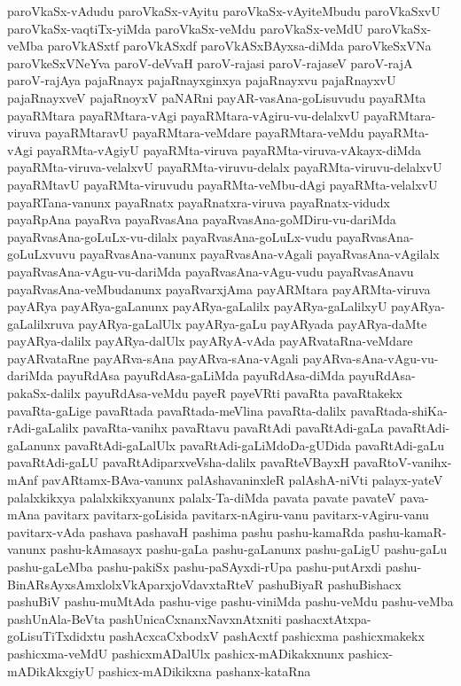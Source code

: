 {paroVkaSx-vAdudu
paroVkaSx-vAyitu
paroVkaSx-vAyiteMbudu
paroVkaSxvU
paroVkaSx-vaqtiTx-yiMda
paroVkaSx-veMdu
paroVkaSx-veMdU
paroVkaSx-veMba
paroVkASxtf
paroVkASxdf
paroVkASxBAyxsa-diMda
paroVkeSxVNa
paroVkeSxVNeYva
paroV-deVvaH
paroV-rajasi
paroV-rajaseV
paroV-rajA
paroV-rajAya
pajaRnayx
pajaRnayxginxya
pajaRnayxvu
pajaRnayxvU
pajaRnayxveV
pajaRnoyxV
paNARni
payAR-vasAna-goLisuvudu
payaRMta
payaRMtara
payaRMtara-vAgi
payaRMtara-vAgiru-vu-delalxvU
payaRMtara-viruva
payaRMtaravU
payaRMtara-veMdare
payaRMtara-veMdu
payaRMta-vAgi
payaRMta-vAgiyU
payaRMta-viruva
payaRMta-viruva-vAkayx-diMda
payaRMta-viruva-velalxvU
payaRMta-viruvu-delalx
payaRMta-viruvu-delalxvU
payaRMtavU
payaRMta-viruvudu
payaRMta-veMbu-dAgi
payaRMta-velalxvU
payaRTana-vanunx
payaRnatx
payaRnatxra-viruva
payaRnatx-vidudx
payaRpAna
payaRva
payaRvasAna
payaRvasAna-goMDiru-vu-dariMda
payaRvasAna-goLuLx-vu-dilalx
payaRvasAna-goLuLx-vudu
payaRvasAna-goLuLxvuvu
payaRvasAna-vanunx
payaRvasAna-vAgali
payaRvasAna-vAgilalx
payaRvasAna-vAgu-vu-dariMda
payaRvasAna-vAgu-vudu
payaRvasAnavu
payaRvasAna-veMbudanunx
payaRvarxjAma
payARMtara
payARMta-viruva
payARya
payARya-gaLanunx
payARya-gaLalilx
payARya-gaLalilxyU
payARya-gaLalilxruva
payARya-gaLalUlx
payARya-gaLu
payARyada
payARya-daMte
payARya-dalilx
payARya-dalUlx
payARyA-vAda
payARvataRna-veMdare
payARvataRne
payARva-sAna
payARva-sAna-vAgali
payARva-sAna-vAgu-vu-dariMda
payuRdAsa
payuRdAsa-gaLiMda
payuRdAsa-diMda
payuRdAsa-pakaSx-dalilx
payuRdAsa-veMdu
payeR
payeVRti
pavaRta
pavaRtakekx
pavaRta-gaLige
pavaRtada
pavaRtada-meVlina
pavaRta-dalilx
pavaRtada-shiKa-rAdi-gaLalilx
pavaRta-vanihx
pavaRtavu
pavaRtAdi
pavaRtAdi-gaLa
pavaRtAdi-gaLanunx
pavaRtAdi-gaLalUlx
pavaRtAdi-gaLiMdoDa-gUDida
pavaRtAdi-gaLu
pavaRtAdi-gaLU
pavaRtAdiparxveVsha-dalilx
pavaRteVBayxH
pavaRtoV-vanihx-mAnf
pavARtamx-BAva-vanunx
palAshavaninxleR
palAshA-niVti
palayx-yateV
palalxkikxya
palalxkikxyanunx
palalx-Ta-diMda
pavata
pavate
pavateV
pava-mAna
pavitarx
pavitarx-goLisida
pavitarx-nAgiru-vanu
pavitarx-vAgiru-vanu
pavitarx-vAda
pashava
pashavaH
pashima
pashu
pashu-kamaRda
pashu-kamaR-vanunx
pashu-kAmasayx
pashu-gaLa
pashu-gaLanunx
pashu-gaLigU
pashu-gaLu
pashu-gaLeMba
pashu-pakiSx
pashu-paSAyxdi-rUpa
pashu-putArxdi
pashu-BinARsAyxsAmxlolxVkAparxjoVdavxtaRteV
pashuBiyaR
pashuBishacx
pashuBiV
pashu-muMtAda
pashu-vige
pashu-viniMda
pashu-veMdu
pashu-veMba
pashUnAla-BeVta
pashUnicaCxnanxNavxnAtxniti
pashacxtAtxpa-goLisuTiTxdidxtu
pashAcxcaCxbodxV
pashAcxtf
pashicxma
pashicxmakekx
pashicxma-veMdU
pashicxmADalUlx
pashicx-mADikakxnunx
pashicx-mADikAkxgiyU
pashicx-mADikikxna
pashanx-kataRna
}
